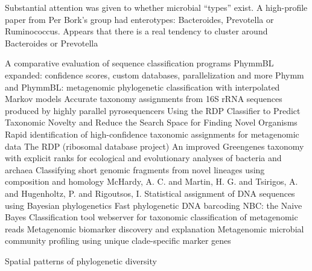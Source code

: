 Substantial attention was given to whether microbial ``types'' exist.
A high-profile paper from Per Bork's group had enterotypes: Bacteroides, Prevotella or Ruminococcus.
\cite{arumugam2011enterotypes}
Appears that there is a real tendency to cluster around Bacteroides or Prevotella \cite{wu2011linking}


\cite{ColeEaRDP2009}
\cite{carma}
\cite{bazinet2012comparative}
A comparative evaluation of sequence classification programs
\cite{brady2011phymmbl}
PhymmBL expanded: confidence scores, custom databases, parallelization and more
\cite{brady2009phymm}
Phymm and PhymmBL: metagenomic phylogenetic classification with interpolated Markov models
\cite{liu2008accurate}
Accurate taxonomy assignments from 16S rRNA sequences produced by highly parallel pyrosequencers
\cite{lan2012using}
Using the RDP Classifier to Predict Taxonomic Novelty and Reduce the Search Space for Finding Novel Organisms
\cite{macdonald2012rapid}
Rapid identification of high-confidence taxonomic assignments for metagenomic data
\cite{maidak1997rdp}
The RDP (ribosomal database project)
\cite{mcdonald2011improved}
An improved Greengenes taxonomy with explicit ranks for ecological and evolutionary analyses of bacteria and archaea
\cite{parks2011classifying}
Classifying short genomic fragments from novel lineages using composition and homology
\cite{phylopythia}
McHardy, A. C.  and Martin, H. G.  and Tsirigos, A.  and Hugenholtz, P.  and Rigoutsos, I.
\cite{munch2008statistical}
Statistical assignment of DNA sequences using Bayesian phylogenetics
\cite{munch2008fast}
Fast phylogenetic DNA barcoding
\cite{rosen2011nbc}
NBC: the Naive Bayes Classification tool webserver for taxonomic classification of metagenomic reads
\cite{segata2011metagenomic}
Metagenomic biomarker discovery and explanation
\cite{segata2012metagenomic}
Metagenomic microbial community profiling using unique clade-specific marker genes

\cite{morlon2011spatial}
Spatial patterns of phylogenetic diversity







